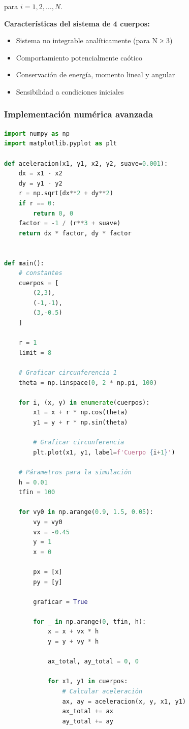 \documentclass{article}
\begin{document}
\begin{center}
	para $i = 1, 2, \ldots, N$.
	
	\textbf{Características del sistema de 4 cuerpos:}
	\begin{itemize}
	\item Sistema no integrable analíticamente (para N ≥ 3)
	\item Comportamiento potencialmente caótico
	\item Conservación de energía, momento lineal y angular
	\item Sensibilidad a condiciones iniciales
	\end{itemize}
	
	\subsubsection{Implementación numérica avanzada}
	
	\begin{lstlisting}[language=Python, caption={Sistema completo de 4 cuerpos con análisis dinámico}]
import numpy as np
import matplotlib.pyplot as plt

def aceleracion(x1, y1, x2, y2, suave=0.001):
    dx = x1 - x2
    dy = y1 - y2
    r = np.sqrt(dx**2 + dy**2)
    if r == 0:
        return 0, 0
    factor = -1 / (r**3 + suave)
    return dx * factor, dy * factor


def main():
    # constantes
    cuerpos = [
        (2,3),
        (-1,-1),
        (3,-0.5)
    ]

    r = 1
    limit = 8

    # Graficar circunferencia 1
    theta = np.linspace(0, 2 * np.pi, 100)

    for i, (x, y) in enumerate(cuerpos):
        x1 = x + r * np.cos(theta)
        y1 = y + r * np.sin(theta)

        # Graficar circunferencia
        plt.plot(x1, y1, label=f'Cuerpo {i+1}')

    # Párametros para la simulación
    h = 0.01
    tfin = 100
    
    for vy0 in np.arange(0.9, 1.5, 0.05):
        vy = vy0
        vx = -0.45
        y = 1
        x = 0

        px = [x]
        py = [y]

        graficar = True

        for _ in np.arange(0, tfin, h):
            x = x + vx * h
            y = y + vy * h

            ax_total, ay_total = 0, 0

            for x1, y1 in cuerpos:
                # Calcular aceleración
                ax, ay = aceleracion(x, y, x1, y1)
                ax_total += ax
                ay_total += ay
            

\end{lstlisting}
\end{center}
\end{document}
